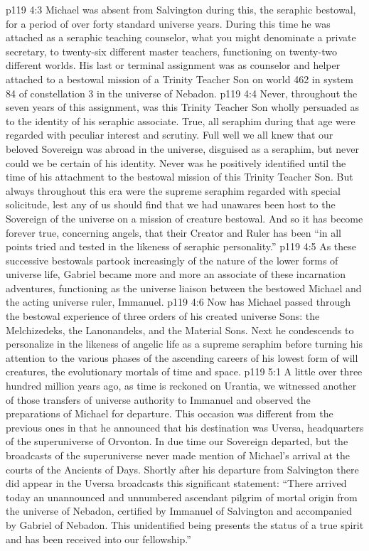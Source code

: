 \vs p119 4:3 Michael was absent from Salvington during this, the seraphic bestowal, for a period of over forty standard universe years. During this time he was attached as a seraphic teaching counselor, what you might denominate a private secretary, to twenty\hyp{}six different master teachers, functioning on twenty\hyp{}two different worlds. His last or terminal assignment was as counselor and helper attached to a bestowal mission of a Trinity Teacher Son on world 462 in system 84 of constellation 3 in the universe of Nebadon.\plusone
\vs p119 4:4 Never, throughout the seven years of this assignment, was this Trinity Teacher Son wholly persuaded as to the identity of his seraphic associate. True, all seraphim during that age were regarded with peculiar interest and scrutiny. Full well we all knew that our beloved Sovereign was abroad in the universe, disguised as a seraphim, but never could we be certain of his identity. Never was he positively identified until the time of his attachment to the bestowal mission of this Trinity Teacher Son. But always throughout this era were the supreme seraphim regarded with special solicitude, lest any of us should find that we had unawares been host to the Sovereign of the universe on a mission of creature bestowal. And so it has become forever true, concerning angels, that their Creator and Ruler has been “in all points tried and tested in the likeness of seraphic personality.”
\vs p119 4:5 As these successive bestowals partook increasingly of the nature of the lower forms of universe life, Gabriel became more and more an associate of these incarnation adventures, functioning as the universe liaison between the bestowed Michael and the acting universe ruler, Immanuel.
\pc \vs p119 4:6 Now has Michael passed through the bestowal experience of three orders of his created universe Sons: the Melchizedeks, the Lanonandeks, and the Material Sons. Next he condescends to personalize in the likeness of angelic life as a supreme seraphim before turning his attention to the various phases of the ascending careers of his lowest form of will creatures, the evolutionary mortals of time and space.
\vs p119 5:1 A little over three hundred million years ago, as time is reckoned on Urantia, we witnessed another of those transfers of universe authority to Immanuel and observed the preparations of Michael for departure. This occasion was different from the previous ones in that he announced that his destination was Uversa, headquarters of the superuniverse of Orvonton. In due time our Sovereign departed, but the broadcasts of the superuniverse never made mention of Michael’s arrival at the courts of the Ancients of Days. Shortly after his departure from Salvington there did appear in the Uversa broadcasts this significant statement: “There arrived today an unannounced and unnumbered ascendant pilgrim of mortal origin from the universe of Nebadon, certified by Immanuel of Salvington and accompanied by Gabriel of Nebadon. This unidentified being presents the status of a true spirit and has been received into our fellowship.”
